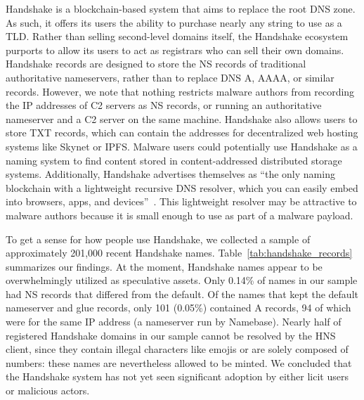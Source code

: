 Handshake is a blockchain-based system that aims to 
replace the root DNS 
zone. As such, it offers its users the ability to purchase 
nearly any string to 
use as a TLD. Rather than selling second-level domains 
itself, the Handshake ecosystem purports to allow its users 
to act as registrars who can sell their own domains. 
Handshake records are designed to store the NS records of traditional 
authoritative nameservers, rather than to replace DNS A, AAAA, or similar 
records. However, we note that nothing 
restricts malware authors from recording the IP addresses of C2 servers as NS 
records, or running an authoritative nameserver and a C2 server on the same 
machine. Handshake also allows users to store TXT records, which can 
contain the addresses for decentralized web hosting systems 
like Skynet or IPFS. Malware users could potentially use 
Handshake as a naming system to find content stored in 
content-addressed distributed storage systems. Additionally, Handshake 
advertises themselves as ``the only naming blockchain with a lightweight 
recursive DNS resolver, which you can easily embed into 
browsers, apps, and devices''~\cite{namebase_access_handshake}. 
This lightweight resolver may be attractive to malware authors because it is 
small enough to use as part of a malware payload.


To get a sense for how people use Handshake, we collected a 
sample of approximately 201,000 recent Handshake names.
Table~\ref{tab:handshake_records} 
summarizes our findings. At the moment, Handshake names appear to be 
overwhelmingly utilized as speculative assets. Only 0.14\% of 
names in our sample had NS records that differed from the 
default. Of the names that kept the default nameserver and 
glue records, only 101 (0.05\%) contained A records, 94 of 
which were for the same IP address (a nameserver run by 
Namebase). Nearly half 
of registered 
Handshake domains in our sample cannot be 
resolved by the HNS client, since they contain illegal characters like emojis 
or are solely composed of numbers: these names are nevertheless allowed to be 
minted. We concluded that the Handshake system has not yet 
seen significant adoption by either licit users or malicious 
actors.

